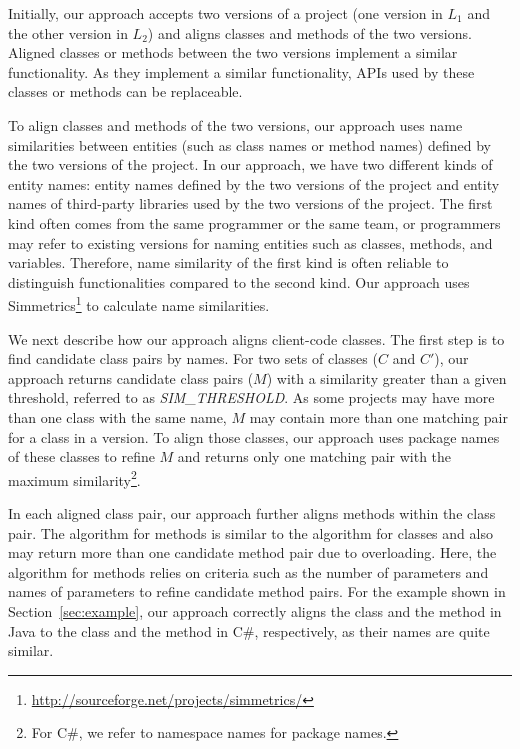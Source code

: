 Initially, our approach accepts two versions of a project (one version in
$L_1$ and the other version in $L_2$) and aligns classes and methods
of the two versions. Aligned classes or methods
between the two versions implement a similar functionality. As they
implement a similar functionality, APIs used by these classes or methods can be
replaceable.

To align classes and methods of the two versions, our approach uses
name similarities between entities (such as class names or method
names) defined by the two versions of the project. In our approach,
we have two different kinds of entity names: entity names defined by
the two versions of the project and entity names of third-party
libraries used by the two versions of the project. The first kind
often comes from the same programmer or the same team, or
programmers may refer to existing versions for naming entities such
as classes, methods, and variables. Therefore, name similarity of
the first kind is often reliable to distinguish functionalities
compared to the second kind. Our approach uses
Simmetrics\footnote{\url{http://sourceforge.net/projects/simmetrics/}}
to calculate name similarities.

We next describe how our approach aligns client-code classes. 
The first step is to find candidate class pairs by names. For two sets
of classes ($C$ and $C'$), our approach returns candidate class
pairs ($M$) with a similarity greater than a given threshold,
referred to as \emph{SIM\_THRESHOLD}. As some projects may have more
than one class with the same name, $M$ may contain more than one
matching pair for a class in a version. To align those classes, our
approach uses package names of these classes to refine $M$ and
returns only one matching pair with the maximum
similarity\footnote{For C\#, we refer to namespace names for package
names.}.

In each aligned class pair, our approach further aligns methods
within the class pair. The algorithm for methods is similar to the
algorithm for classes and also may return more than one candidate
method pair due to overloading. Here, the algorithm for methods
relies on criteria such as the number of parameters and names of
parameters to refine candidate method pairs. For the example shown
in Section~\ref{sec:example}, our approach correctly aligns the
class  and the method  in Java to
the class  and the method  in C\#,
respectively, as their names are quite similar.
